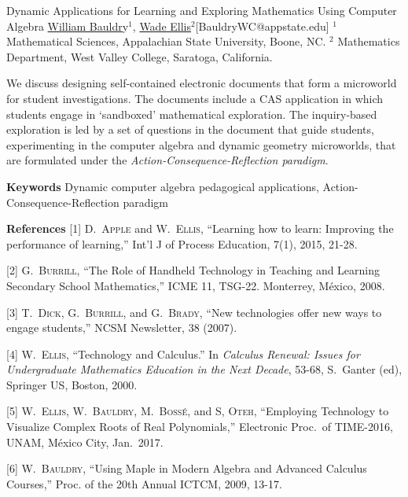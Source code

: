 


\begin{abstract_online}{Dynamic Applications for Learning and Exploring Mathematics Using Computer Algebra}{%
        \underline{William Bauldr}y$^{1}$, \underline{Wade Ellis}$^{2}$}{[BauldryWC@appstate.edu]
        }{%
        $^1$ Mathematical Sciences, Appalachian State University, Boone, NC. \newline{}
        $^2$ Mathematics Department, West Valley College, Saratoga, California.%
        }
    
We discuss designing self-contained electronic documents that form a microworld for student investigations. The documents include a CAS application in which students engage in `sandboxed' mathematical exploration. The inquiry-based exploration is led by a set of questions in the document that guide students, experimenting in the computer algebra and dynamic geometry microworlds, that are formulated under the \emph{Action-Consequence-Reflection paradigm}.

\textbf{Keywords} \newline{} Dynamic computer algebra pedagogical applications, Action-Consequence-Reflection paradigm

\textbf{References} \newline{}
[1] \textsc{D.~Apple} and \textsc{W.~Ellis}, ``Learning how to learn: Improving the performance of learning,'' Int'l J of Process Education, 7(1), 2015, 21-28.

[2] \textsc{G.~Burrill}, ``The Role of Handheld Technology in Teaching and Learning Secondary School Mathematics,'' ICME 11, TSG-22. Monterrey, M\'{e}xico, 2008.

[3] \textsc{T.~Dick}, \textsc{G.~Burrill}, and \textsc{G.~Brady}, ``New technologies offer new ways to engage students,'' NCSM Newsletter, 38 (2007).

[4] \textsc{W.~Ellis}, ``Technology and Calculus.'' In \emph{Calculus Renewal: Issues for Undergraduate Mathematics Education in the Next Decade}, 53-68, S.~Ganter (ed), Springer US, Boston, 2000.

[5] \textsc{W.~Ellis, W.~Bauldry, M.~Boss\'e,} and \textsc{S, Oteh}, ``Employing Technology to Visualize Complex Roots of Real Polynomials,'' Electronic Proc.~of TIME-2016, UNAM, M\'{e}xico City, Jan.~2017.

[6] \textsc{W.~Bauldry}, ``Using Maple in Modern Algebra and Advanced Calculus Courses,'' Proc. of the 20th Annual ICTCM, 2009, 13-17.

\end{abstract_online}
